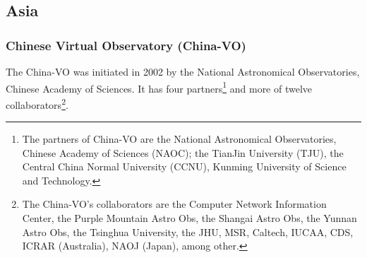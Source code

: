\begin{comment}
\item \textbf{Description:}
\end{itemize}
\item Variable Star Calculator
\begin{itemize}
\item \textbf{Description:}
\end{itemize}
\item Variable Star Calculator
\begin{itemize}
\item \textbf{Description:}
\end{itemize}
\end{itemize}
\end{itemize}
\end{comment}

\subsection{Asia}
\subsubsection{Chinese Virtual Observatory (China-VO)}
The China-VO \cite{website:china-vo-home} was initiated in 2002 by the National
Astronomical Observatories, Chinese Academy of Sciences. It has four
partners\footnote{The partners of China-VO are the National Astronomical
Observatories, Chinese Academy of Sciences (NAOC); the TianJin University (TJU),
the Central China Normal University (CCNU), Kunming University of Science and
Technology.} and more of twelve collaborators\footnote{The China-VO's
collaborators are the Computer Network Information Center, the Purple Mountain
Astro Obs, the Shangai Astro Obs, the Yunnan Astro Obs, the Tsinghua University,
the JHU, MSR, Caltech, IUCAA, CDS, ICRAR (Australia), NAOJ (Japan), among
other.}.

